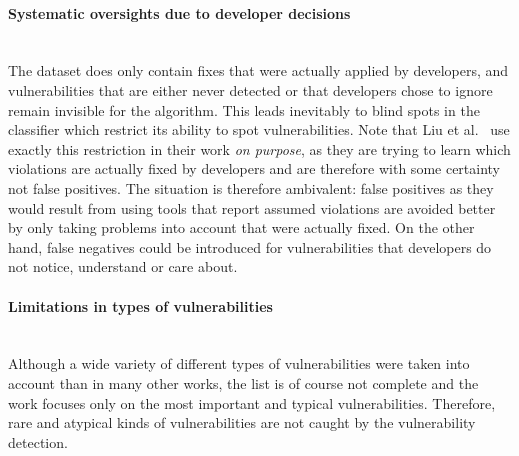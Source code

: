 \documentclass[
a4paper,
pagesize,
pdftex,
12pt,
twoside, %
BCOR=5mm, %
ngerman,
fleqn,
final,
]{scrartcl}
\begin{document}
	\paragraph{Systematic oversights due to developer decisions}\mbox{}\\
	The dataset does only contain fixes that were actually applied by developers, and vulnerabilities that are either never detected or that developers chose to ignore remain invisible for the algorithm. This leads inevitably to blind spots in the classifier which restrict its ability to spot vulnerabilities. Note that Liu et al.~\cite{Liu.2018} use exactly this restriction in their work \textit{on purpose}, as they are trying to learn which violations are actually fixed by developers and are therefore with some certainty  not false positives. The situation is therefore ambivalent: false positives as they would result from using tools that report assumed violations are avoided better by only taking problems into account that were actually fixed. On the other hand, false negatives could be introduced for vulnerabilities that developers do not notice, understand or care about.
	\paragraph{Limitations in types of vulnerabilities}\mbox{}\\
	Although a wide variety of different types of vulnerabilities were taken into account than in many other works, the list is of course not complete and the work focuses only on the most important and typical vulnerabilities. Therefore, rare and atypical kinds of vulnerabilities are not caught by the vulnerability detection.
\end{document}

